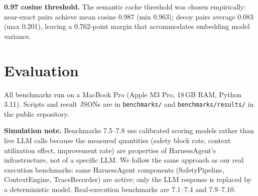 \documentclass[conference]{IEEEtran}
\begin{document}
\textbf{0.97 cosine threshold.} The semantic cache threshold was chosen
empirically: near-exact pairs achieve mean cosine 0.987 (min 0.963);
decoy pairs average 0.083 (max 0.201), leaving a 0.762-point margin
that accommodates embedding model variance.

\section{Evaluation}
\label{sec:evaluation}

All benchmarks run on a MacBook Pro (Apple M3 Pro, 18\,GB RAM, Python
3.11). Scripts and result JSONs are in \texttt{benchmarks/} and
\texttt{benchmarks/results/} in the public repository.

\textbf{Simulation note.} Benchmarks 7.5--7.8 use calibrated scoring
models rather than live LLM calls because the measured quantities
(safety block rate, context utilization effect, improvement rate) are
properties of HarnessAgent's infrastructure, not of a specific LLM.
We follow the same approach as our real execution benchmarks: same
HarnessAgent components (SafetyPipeline, ContextEngine, TraceRecorder)
are active; only the LLM response is replaced by a deterministic model.
Real-execution benchmarks are 7.1--7.4 and 7.9--7.10.
\end{document}

